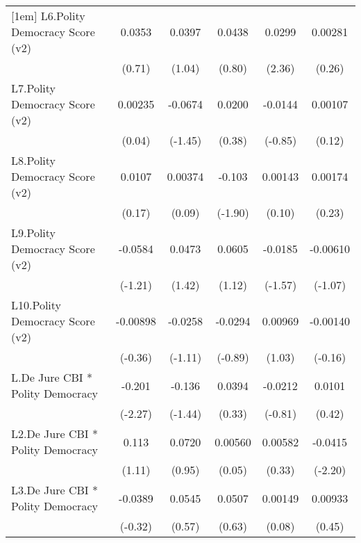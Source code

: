 {\begin{tabular}{l*{5}{c}}
[1em]
L6.Polity Democracy Score (v2)&   0.0353         &   0.0397         &   0.0438         &   0.0299\sym{*}  &  0.00281         \\
                &   (0.71)         &   (1.04)         &   (0.80)         &   (2.36)         &   (0.26)         \\
[1em]
L7.Polity Democracy Score (v2)&  0.00235         &  -0.0674         &   0.0200         &  -0.0144         &  0.00107         \\
                &   (0.04)         &  (-1.45)         &   (0.38)         &  (-0.85)         &   (0.12)         \\
[1em]
L8.Polity Democracy Score (v2)&   0.0107         &  0.00374         &   -0.103         &  0.00143         &  0.00174         \\
                &   (0.17)         &   (0.09)         &  (-1.90)         &   (0.10)         &   (0.23)         \\
[1em]
L9.Polity Democracy Score (v2)&  -0.0584         &   0.0473         &   0.0605         &  -0.0185         & -0.00610         \\
                &  (-1.21)         &   (1.42)         &   (1.12)         &  (-1.57)         &  (-1.07)         \\
[1em]
L10.Polity Democracy Score (v2)& -0.00898         &  -0.0258         &  -0.0294         &  0.00969         & -0.00140         \\
                &  (-0.36)         &  (-1.11)         &  (-0.89)         &   (1.03)         &  (-0.16)         \\
[1em]
L.De Jure CBI * Polity Democracy&   -0.201\sym{*}  &   -0.136         &   0.0394         &  -0.0212         &   0.0101         \\
                &  (-2.27)         &  (-1.44)         &   (0.33)         &  (-0.81)         &   (0.42)         \\
[1em]
L2.De Jure CBI * Polity Democracy&    0.113         &   0.0720         &  0.00560         &  0.00582         &  -0.0415\sym{*}  \\
                &   (1.11)         &   (0.95)         &   (0.05)         &   (0.33)         &  (-2.20)         \\
[1em]
L3.De Jure CBI * Polity Democracy&  -0.0389         &   0.0545         &   0.0507         &  0.00149         &  0.00933         \\
                &  (-0.32)         &   (0.57)         &   (0.63)         &   (0.08)         &   (0.45)         \\

\end{tabular}}
